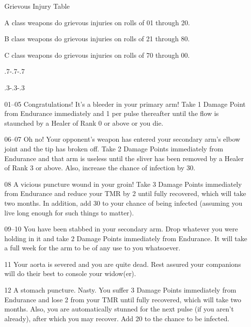 \begin{Chapter}{Grievous Injury Table}

\begin{Enumerate}
\item A class weapons do grievous injuries on rolls of 01 through 20.  
\item B class weapons do grievous injuries on rolls of 21 through 80.  
\item C class weapons do grievous injuries on rolls of 70 through 00.
\end{Enumerate}


\makeatletter
\patchcmd{\@item}
  {\addvspace\itemsep}
  {\par\kern\dimexpr.7\itemsep-.7\parskip-.7\baselineskip\relax%
   \hrulefill%
   \par\kern\dimexpr.3\itemsep-.3\parskip-.3\baselineskip\relax}
  {}{}%
\makeatother
  
\begin{Description}
\item[01–05] Congratulations! It’s a bleeder in your primary arm! Take
  1 Damage Point from Endurance immediately and 1 per pulse thereafter
  until the flow is staunched by a Healer of Rank 0 or above or you
  die.

\item[06–07] Oh no! Your opponent’s weapon has entered your secondary
  arm’s elbow joint and the tip has broken off. Take 2 Damage Points
  immediately from Endurance and that arm is useless until the sliver
  has been removed by a Healer of Rank 3 or above. Also, increase the
  chance of infection by 30.

\item[08] A vicious puncture wound in your groin!  Take 3 Damage
  Points immediately from Endurance and reduce your TMR by 2 until
  fully recovered, which will take two months. In addition, add 30 to
  your chance of being infected (assuming you live long enough for
  such things to matter).

\item[09–10] You have been stabbed in your secondary arm. Drop
  whatever you were holding in it and take 2 Damage Points immediately
  from Endurance. It will take a full week for the arm to be of any
  use to you whatsoever.

\item[11] Your aorta is severed and you are quite dead. Rest assured
  your companions will do their best to console your widow(er).

\item[12] A stomach puncture. Nasty. You suffer 3 Damage Points
  immediately from Endurance and lose 2 from your TMR until fully
  recovered, which will take two months. Also, you are automatically
  stunned for the next pulse (if you aren’t already), after which you
  may recover.  Add 20 to the chance to be infected.


\end{Description}
\end{Chapter}
